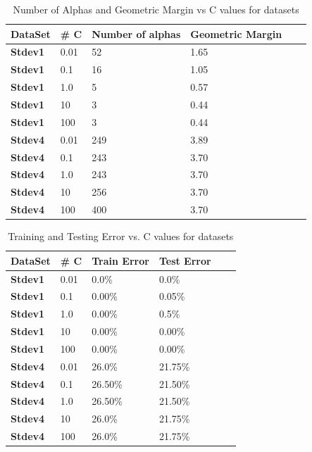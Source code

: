 \documentclass[pageno]{jpaper}
\begin{document}
\begin{table}[h!]
  \centering
  \begin{tabular}{llllll|}
    \hline
     \textbf{DataSet} &\textbf{\# C}  & \textbf{Number of alphas}  & \textbf{Geometric Margin} \\
    \hline
    \hline
 \textbf{Stdev1} 	&0.01 &52 &1.65  \\
 \hline
  \textbf{Stdev1} 	&0.1 &16 & 1.05  \\
 \hline
  \textbf{Stdev1} 	&1.0 &5 &0.57  \\
 \hline
  \textbf{Stdev1} 	&10 &3 &0.44  \\
 \hline
  \textbf{Stdev1} 	&100 &3 &0.44  \\
 \hline
  \textbf{Stdev4} 	&0.01 &249 & 3.89  \\
 \hline
  \textbf{Stdev4} 	&0.1 &243 &3.70  \\
 \hline
  \textbf{Stdev4} 	&1.0 &243 &3.70  \\
 \hline
  \textbf{Stdev4} 	&10 &256 &3.70  \\
 \hline
  \textbf{Stdev4} 	&100 &400 &3.70  \\
 \hline
 
 \end{tabular}
  \caption{Number of Alphas and Geometric Margin vs C values for datasets}
  \label{table:formatting}
\end{table}

\begin{table}[h!]
  \centering
  \begin{tabular}{llllll|}
    \hline
     \textbf{DataSet} &\textbf{\# C}  & \textbf{Train Error}  & \textbf{Test Error} \\
    \hline
    \hline
 \textbf{Stdev1} 	&0.01 &0.0\% & 0.0\%  \\
 \hline
  \textbf{Stdev1} 	&0.1 &0.00\% & 0.05\%  \\
 \hline
  \textbf{Stdev1} 	&1.0 &0.00\% &0.5\%  \\
 \hline
  \textbf{Stdev1} 	&10 &0.00\% &0.00\%  \\
 \hline
  \textbf{Stdev1} 	&100 &0.00\% &0.00\%  \\
 \hline
  \textbf{Stdev4} 	&0.01 &26.0\% & 21.75\%  \\
 \hline
  \textbf{Stdev4} 	&0.1 &26.50\% &21.50\%  \\
 \hline
  \textbf{Stdev4} 	&1.0 &26.50\% &21.50\%  \\
 \hline
  \textbf{Stdev4} 	&10 &26.0\% & 21.75\%  \\
 \hline
  \textbf{Stdev4} 	&100 &26.0\% & 21.75\%  \\
 \hline
 
 \end{tabular}
  \caption{Training and Testing Error vs. C values for datasets}
  \label{table:formatting}
\end{table}
\end{document}
